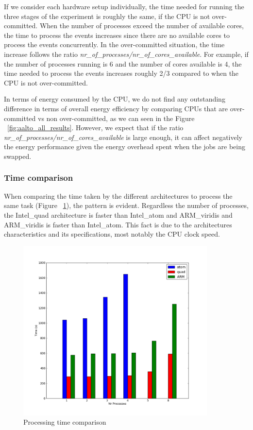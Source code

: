 If we consider each hardware setup individually, the time needed for running the three stages of the experiment is roughly the same, if the CPU is not over-committed. When
the number of processes exceed the number of available cores, the time to 
process the events increases since there are no available cores to process the
events concurrently. In the over-committed situation, the time increase follows
the ratio \textit{nr\_of\_processes/nr\_of\_cores\_available}. 
For example, if the
number of processes running is 6 and the number of cores available is 4, the
time needed to process the events increases roughly 2/3 compared to when the
CPU is not over-committed.

In terms of energy consumed by the CPU, we do not find any outstanding difference in terms of overall energy efficiency by comparing CPUs that are over-committed vs non over-committed, as we can seen in the Figure ~\ref{fig:aalto_all_results}. However, we expect that if the ratio \textit{nr\_of\_processes/nr\_of\_cores\_available} is large enough, it can affect negatively the energy performance given the energy overhead spent when the jobs are being swapped.


\subsubsection*{Time comparison}
When comparing the time taken by the different architectures to process the same
task (Figure ~\ref{fig:aalto_time}), the pattern is evident. 
Regardless the number of processes, the 
Intel\_quad architecture is faster than Intel\_atom and ARM\_viridis and ARM\_viridis is faster than Intel\_atom.
This fact is due to the architectures characteristics and its specifications, most notably the CPU clock speed.\\

\begin{figure}[h]
  \centering
    \includegraphics[width=100mm]{"img/aalto/aalto_all_time"}
    \caption{Processing time comparison}
    \label{fig:aalto_time}
\end{figure}


